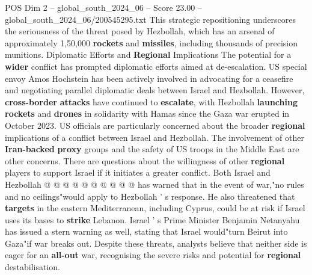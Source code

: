 \begin{textsample}{POS Dim 2 – global\_south\_2024\_06 – Score 23.00 – global\_south\_2024\_06/200545295.txt}
This strategic repositioning underscores the seriousness of the threat posed by Hezbollah, which has an arsenal of approximately 1,50,000 \textbf{rockets} and \textbf{missiles}, including thousands of precision munitions.
Diplomatic Efforts and \textbf{Regional} Implications The potential for a \textbf{wider} conflict has prompted diplomatic efforts aimed at de-escalation.
US special envoy Amos Hochstein has been actively involved in advocating for a ceasefire and negotiating parallel diplomatic deals between Israel and Hezbollah.
However, \textbf{cross-border} \textbf{attacks} have continued to \textbf{escalate}, with Hezbollah \textbf{launching} \textbf{rockets} and \textbf{drones} in solidarity with Hamas since the Gaza war erupted in October 2023.
US officials are particularly concerned about the broader \textbf{regional} implications of a conflict between Israel and Hezbollah.
The involvement of other \textbf{Iran-backed} \textbf{proxy} groups and the safety of US troops in the Middle East are other concerns.
There are questions about the willingness of other \textbf{regional} players to support Israel if it initiates a greater conflict.
Both Israel and Hezbollah @ @ @ @ @ @ @ @ @ @ has warned that in the event of war,"no rules and no ceilings"would apply to Hezbollah ' s response.
He also threatened that \textbf{targets} in the eastern Mediterranean, including Cyprus, could be at risk if Israel uses its bases to \textbf{strike} Lebanon.
Israel ' s Prime Minister Benjamin Netanyahu has issued a stern warning as well, stating that Israel would"turn Beirut into Gaza"if war breaks out.
Despite these threats, analysts believe that neither side is eager for an \textbf{all-out} war, recognising the severe risks and potential for \textbf{regional} destabilisation.

\end{textsample}
